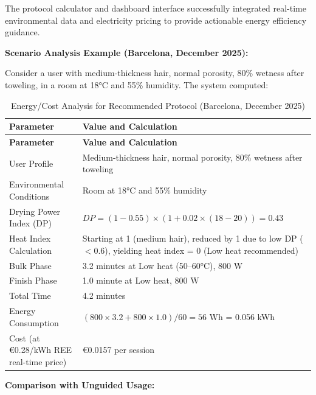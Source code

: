 \documentclass[11pt,a4paper]{article}
\begin{document}
The protocol calculator and dashboard interface successfully integrated real-time environmental data and electricity pricing to provide actionable energy efficiency guidance.

\vspace{0.5em}
\noindent\textbf{Scenario Analysis Example (Barcelona, December 2025):}

\noindent Consider a user with medium-thickness hair, normal porosity, 80\% wetness after toweling, in a room at 18°C and 55\% humidity. The system computed:

\begin{longtable}{|p{}|p{}|}
\caption{Energy/Cost Analysis for Recommended Protocol (Barcelona, December 2025)}
\label{tab:energy_scenario_analysis} \\
\hline
\textbf{Parameter} & \textbf{Value and Calculation} \\
\hline
\endfirsthead
\hline
\textbf{Parameter} & \textbf{Value and Calculation} \\
\hline
\endhead
\hline
\endfoot
\hline
\endlastfoot
User Profile & Medium-thickness hair, normal porosity, 80\% wetness after toweling \\
\hline
Environmental Conditions & Room at 18°C and 55\% humidity \\
\hline
Drying Power Index (DP) & $DP = (1 - 0.55) \times (1 + 0.02 \times (18 - 20)) = 0.43$ \\
\hline
Heat Index Calculation & Starting at 1 (medium hair), reduced by 1 due to low DP ($< 0.6$), yielding heat index = 0 (Low heat recommended) \\
\hline
Bulk Phase & 3.2 minutes at Low heat (50--60°C), 800 W \\
\hline
Finish Phase & 1.0 minute at Low heat, 800 W \\
\hline
Total Time & 4.2 minutes \\
\hline
Energy Consumption & $(800 \times 3.2 + 800 \times 1.0) / 60 = 56$ Wh = 0.056 kWh \\
\hline
Cost (at €0.28/kWh REE real-time price) & €0.0157 per session \\
\hline
\end{longtable}

\vspace{0.5em}
\noindent\textbf{Comparison with Unguided Usage:}
\end{document}
